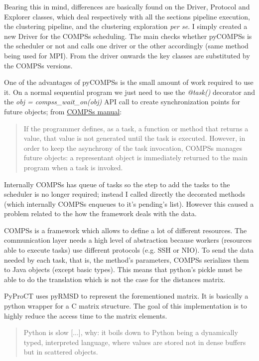 Bearing this in mind, differences are basically found on the Driver, Protocol and Explorer classes, which deal respectively with all the sections pipeline execution, the clustering pipeline, and the clustering exploration \textit{per se}. I simply created a new Driver for the COMPSs scheduling. The main checks whether pyCOMPSs is the scheduler or not and calls one driver or the other accordingly (same method being used for MPI). From the driver onwards the key classes are substituted by the COMPSs versions.

One of the advantages of pyCOMPSs is the small amount of work required to use it. On a normal sequential program we just need to use the \textit{@task()} decorator and the \textit{obj = compss\_wait\_on(obj)} API call to create synchronization points for future objects; from \hyperref[sec:docs]{COMPSs manual}: 

\begin{quote} 
If the programmer defines, as a task, a function or method that returns a value, that value is not generated until the task is executed. However, in order to keep the asynchrony of the task invocation, COMPSs manages future objects: a representant object is immediately returned to the main program when a task is invoked.
\end{quote}

Internally COMPSs has queue of tasks so the step to add the tasks to the scheduler is no longer required; instead I called directly the decorated methods (which internally COMPSs enqueues to it's pending's list). However this caused a problem related to the how the framework deals with the data.

COMPSs is a framework which allows to define a lot of different resources. The communication layer needs a high level of abstraction because workers (resources able to execute tasks) use different protocols (e.g. SSH or NIO). To send the data needed by each task, that is, the method's parameters, COMPSs serializes them to Java objects (except basic types). This means that python's pickle must be able to do the translation which is not the case for the distances matrix.

PyProCT uses pyRMSD to represent the forementioned matrix. It is basically a python wrapper for a C matrix structure. The goal of this implementation is to highly reduce the access time to the matrix elements. 
\begin{quote}
Python is slow [...], why: it boils down to Python being a dynamically typed, interpreted language, where values are stored not in dense buffers but in scattered objects. \cite{vanderplas_why_2014}
\end{quote}

